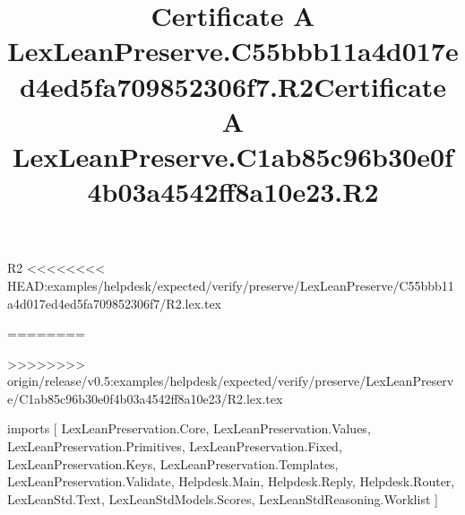 \begin{lexlean}{R2}
<<<<<<<< HEAD:examples/helpdesk/expected/verify/preserve/LexLeanPreserve/C55bbb11a4d017ed4ed5fa709852306f7/R2.lex.tex
\title{Certificate A LexLeanPreserve.C55bbb11a4d017ed4ed5fa709852306f7.R2}
========
\title{Certificate A LexLeanPreserve.C1ab85c96b30e0f4b03a4542ff8a10e23.R2}
>>>>>>>> origin/release/v0.5:examples/helpdesk/expected/verify/preserve/LexLeanPreserve/C1ab85c96b30e0f4b03a4542ff8a10e23/R2.lex.tex
\begin{coremodule}
imports [
  LexLeanPreservation.Core,
  LexLeanPreservation.Values,
  LexLeanPreservation.Primitives,
  LexLeanPreservation.Fixed,
  LexLeanPreservation.Keys,
  LexLeanPreservation.Templates,
  LexLeanPreservation.Validate,
  Helpdesk.Main,
  Helpdesk.Reply,
  Helpdesk.Router,
  LexLeanStd.Text,
  LexLeanStdModels.Scores,
  LexLeanStdReasoning.Worklist
]


\end{coremodule}
\end{lexlean}

